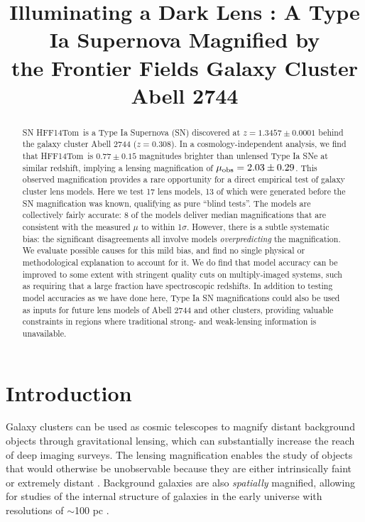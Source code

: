 \documentclass[iop]{emulateapj}
\def\tomas{HFF14Tom}
\begin{document}
\title{Illuminating a Dark Lens : A Type Ia Supernova Magnified by \\ the Frontier Fields Galaxy Cluster Abell 2744}




\begin{abstract}
{
SN \tomas\ is a Type Ia Supernova (SN) discovered at
$z=1.3457\pm0.0001$ behind the galaxy cluster Abell 2744 ($z=0.308$).
In a cosmology-independent analysis, we find that \tomas\ is
$0.77\pm0.15$ magnitudes brighter than unlensed Type Ia SNe at similar
redshift, implying a lensing magnification of $\mu_{\rm
obs}=2.03\pm0.29$.  This observed magnification provides a rare
opportunity for a direct empirical test of galaxy cluster lens models.
Here we test 17 lens models, 13 of which were generated before the SN
magnification was known, qualifying as pure ``blind tests''.  The
models are collectively fairly accurate: 8 of the models deliver
median magnifications that are consistent with the measured $\mu$ to
within 1$\sigma$.  However, there is a subtle systematic bias: the
significant disagreements all involve models {\it overpredicting} the
magnification. We evaluate possible causes for this mild bias, and
find no single physical or methodological explanation to account for
it.  We do find that model accuracy can be improved to some extent
with stringent quality cuts on multiply-imaged systems, such as
requiring that a large fraction have spectroscopic redshifts.  In
addition to testing model accuracies as we have done here, Type Ia SN
magnifications could also be used as inputs for future lens models of
Abell 2744 and other clusters, providing valuable constraints in
regions where traditional strong- and weak-lensing information is
unavailable.}
\end{abstract}


\section{Introduction}
\label{sec:Introduction}

Galaxy clusters can be used as cosmic telescopes to magnify distant
background objects through gravitational lensing, which can
substantially increase the reach of deep imaging surveys.  The lensing
magnification enables the study of objects that would otherwise be
unobservable because they are either intrinsically
faint \citep[e.g.][]{Schenker:2012,Alavi:2014} or extremely
distant \citep[e.g.][]{Franx:1997,Ellis:2001,Hu:2002,Kneib:2004,Richard:2006,Richard:2008,Bouwens:2009a,Maizy:2010,Zheng:2012,Coe:2013,Bouwens:2014,Zitrin:2014b}.
Background galaxies are also {\it spatially} magnified, allowing for
studies of the internal structure of galaxies in the early universe
with resolutions of $\sim$100
pc \citep[e.g.][]{Stark:2008,Jones:2010,Yuan:2011,Wuyts:2014,Livermore:2015}.
\end{document}
